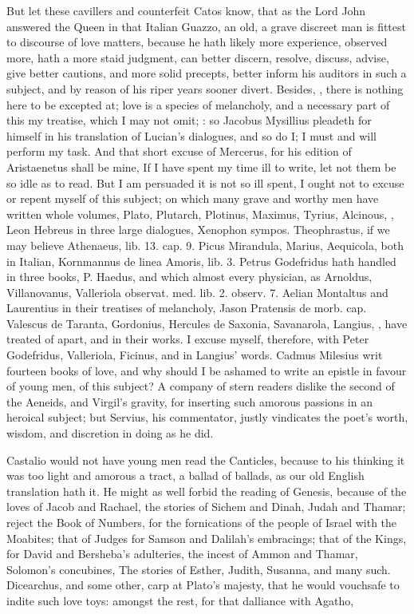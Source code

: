 {But let these cavillers and counterfeit Catos know, that as the Lord
John answered the Queen in that Italian Guazzo, an old, a grave
discreet man is fittest to discourse of love matters, because he hath
likely more experience, observed more, hath a more staid judgment, can
better discern, resolve, discuss, advise, give better cautions, and
more solid precepts, better inform his auditors in such a subject, and
by reason of his riper years sooner divert. Besides, , there is nothing here to be excepted at; love
is a species of melancholy, and a necessary part of this my treatise,
which I may not omit; : so Jacobus
Mysillius pleadeth for himself in his translation of Lucian's
dialogues, and so do I; I must and will perform my task. And that short
excuse of Mercerus, for his edition of Aristaenetus shall be mine,
If I have spent my time ill to write, let not them be so idle as
to read. But I am persuaded it is not so ill spent, I ought not to
excuse or repent myself of this subject; on which many grave and worthy
men have written whole volumes, Plato, Plutarch, Plotinus, Maximus,
Tyrius, Alcinous, \Avicenna{}, Leon Hebreus in three large dialogues,
Xenophon sympos. Theophrastus, if we may believe Athenaeus, lib. 13.
cap. 9. Picus Mirandula, Marius, Aequicola, both in Italian, Kornmannus
de linea Amoris, lib. 3. Petrus Godefridus hath handled in three books,
P. Haedus, and which almost every physician, as Arnoldus, Villanovanus,
Valleriola observat. med. lib. 2. observ. 7. Aelian Montaltus and
Laurentius in their treatises of melancholy, Jason Pratensis de morb.
cap. Valescus de Taranta, Gordonius, Hercules de Saxonia, Savanarola,
Langius, \etc{}, have treated of apart, and in their works. I excuse
myself, therefore, with Peter Godefridus, Valleriola, Ficinus, and in
Langius' words. Cadmus Milesius writ fourteen books of love, and
why should I be ashamed to write an epistle in favour of young men, of
this subject? A company of stern readers dislike the second of the
Aeneids, and Virgil's gravity, for inserting such amorous passions in
an heroical subject; but Servius, his commentator, justly
vindicates the poet's worth, wisdom, and discretion in doing as he did.

Castalio would not have young men read the Canticles, because to
his thinking it was too light and amorous a tract, a ballad of ballads,
as our old English translation hath it. He might as well forbid the
reading of Genesis, because of the loves of Jacob and Rachael, the
stories of Sichem and Dinah, Judah and Thamar; reject the Book of
Numbers, for the fornications of the people of Israel with the
Moabites; that of Judges for Samson and Dalilah's embracings; that of
the Kings, for David and Bersheba's adulteries, the incest of Ammon and
Thamar, Solomon's concubines, \etc{} The stories of Esther, Judith,
Susanna, and many such. Dicearchus, and some other, carp at Plato's
majesty, that he would vouchsafe to indite such love toys: amongst the
rest, for that dalliance with Agatho,

}
